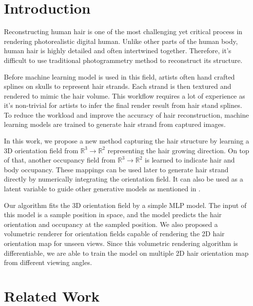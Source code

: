 \documentclass{article}
\begin{document}
\section{Introduction}


Reconstructing human hair is one of the most challenging yet critical process in rendering photorealistic digital human. Unlike other parts of the human body, human hair is highly detailed and often intertwined together. Therefore, it's difficult to use traditional photogrammetry method to reconstruct its structure.

Before machine learning model is used in this field, artists often hand crafted splines on skulls to represent hair strands. Each strand is then textured and rendered to mimic the hair volume. This workflow requires a lot of experience as it's non-trivial for artists to infer the final render result from hair stand splines. To reduce the workload and improve the accuracy of hair reconstruction, machine learning models are trained to generate hair strand from captured images.

In this work, we propose a new method capturing the hair structure by learning a 3D orientation field from $\mathbb{R}^{3} \rightarrow \mathbb{R}^{2}$ representing the hair growing direction. On top of that, another occupancy field from $\mathbb{R}^{3} \rightarrow \mathbb{R}^{2}$ is learned to indicate hair and body occupancy. These mappings can be used later to generate hair strand directly by numerically integrating the orientation field. It can also be used as a latent variable to guide other generative models as mentioned in \cite{metzer_latent-nerf_2022}.


Our algorithm fits the 3D orientation field by a simple MLP model. The input of this model is a sample position in space, and the model predicts the hair orientation and occupancy at the sampled position. We also proposed a volumetric renderer for orientation fields capable of rendering the 2D hair orientation map for unseen views. Since this volumetric rendering algorithm is differentiable, we are able to train the model on multiple 2D hair orientation map from different viewing angles.

\section{Related Work}
\end{document}
